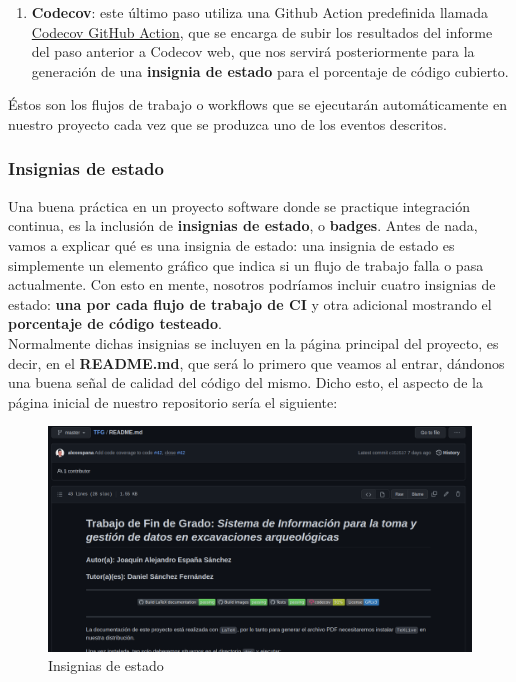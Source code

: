 \begin{enumerate}
\begin{enumerate}
\begin{enumerate}
                        \item \textbf{Codecov}: este último paso utiliza una Github Action
                        predefinida llamada
                        \href{https://github.com/marketplace/actions/codecov}{Codecov GitHub
                        Action}, que se encarga de subir los resultados del informe del paso
                        anterior a Codecov web, que nos servirá posteriormente para la
                        generación de una \textbf{insignia de estado} para el porcentaje de
                        código cubierto.
                    \end{enumerate}
            \end{enumerate}
    \end{enumerate}

Éstos son los flujos de trabajo o workflows que se ejecutarán automáticamente en nuestro
proyecto cada vez que se produzca uno de los eventos descritos.

\subsubsection{Insignias de estado}
Una buena práctica en un proyecto software donde se practique integración continua, es la
inclusión de \textbf{insignias de estado}, o \textbf{badges}. Antes de nada, vamos a
explicar qué es una insignia de estado: una insignia de estado es simplemente un elemento
gráfico que indica si un flujo de trabajo falla o pasa actualmente. Con esto en mente,
nosotros podríamos incluir cuatro insignias de estado: \textbf{una por cada flujo de
trabajo de CI} y otra adicional mostrando el \textbf{porcentaje de código testeado}.\\

Normalmente dichas insignias se incluyen en la página principal del proyecto, es decir, en
el \textbf{README.md}, que será lo primero que veamos al entrar, dándonos una buena señal
de calidad del código del mismo. Dicho esto, el aspecto de la página inicial de nuestro
repositorio sería el siguiente:

    \begin{figure}[H]
        \centering
        \includegraphics[scale=0.27]{imagenes/badge-status.png}
        \caption{Insignias de estado}
        \label{fig:badge-status}
    \end{figure}

